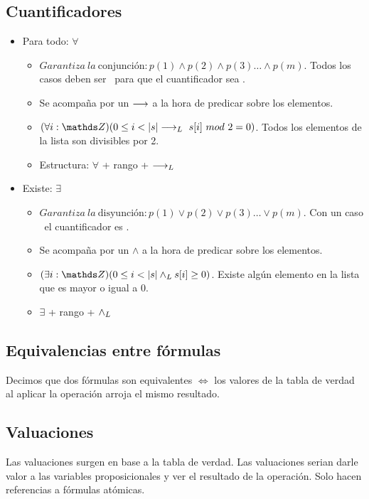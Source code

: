 \documentclass[10pt,a4paper]{article}
\begin{document}
\subsection*{Cuantificadores}
\begin{itemize}
    \item Para todo: \(\forall\)
    \begin{itemize}
        \item \(Garantiza \ la \ \text{conjunción}: p(1) \land p(2) \land p(3) \dots \land p(m) \). Todos los casos deben ser \True \ para que el cuantificador sea \True.
        \item Se acompaña por un \(\longrightarrow\) a la hora de predicar sobre los elementos.
        \item \((\forall i: \ent)(0 \le i < \longitud{s} \implicaLuego \ s[i] \ mod \ 2 = 0)\). Todos los elementos de la lista son divisibles por 2.
        \item Estructura: \(\forall\) + rango + \(\longrightarrow _L\)
    \end{itemize}
    \item Existe: \(\exists\)
    \begin{itemize}
        \item \(Garantiza \ la \ \text{disyunción}: p(1) \lor p(2) \lor p(3) \dots \lor p(m) \). Con un caso \True \ el cuantificador es \True.
        \item Se acompaña por un \(\land\) a la hora de predicar sobre los elementos.
        \item \((\exists i: \ent)(0 \le i < \longitud{s} \yLuego s[i] \ge 0)\). Existe algún elemento en la lista que es mayor o igual a 0.
        \item \(\exists\) + rango + \(\land _L\)
    \end{itemize}
\end{itemize}
\subsection*{Equivalencias entre fórmulas}
Decimos que dos fórmulas son equivalentes \(\iff\) los valores de la tabla de verdad al aplicar la operación arroja el mismo resultado.

\subsection*{Valuaciones}
Las valuaciones surgen en base a la tabla de verdad. Las valuaciones serian darle valor a las variables proposicionales y ver el resultado de la operación. Solo hacen referencias a fórmulas atómicas.
\end{document}
